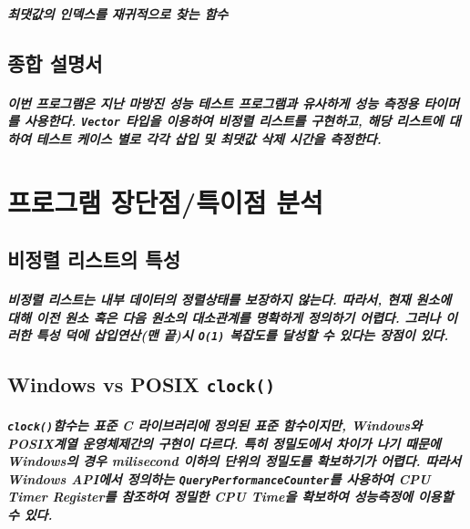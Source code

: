 \documentclass[UTF8, a4paper]{report}
\begin{document}
            \paragraph{%
                \normalfont 최댓값의 인덱스를 재귀적으로 찾는 함수
            }

        \section{종합 설명서}

            \paragraph{%
                \normalfont 이번 프로그램은 지난 마방진 성능 테스트 프로그램과 유사하게 성능 측정용 타이머를 사용한다. \texttt{Vector} 타입을 이용하여 비정렬 리스트를 구현하고, 해당 리스트에 대하여 테스트 케이스 별로 각각 삽입 및 최댓값 삭제 시간을 측정한다. 
            }
            
    \chapter{프로그램 장단점/특이점 분석}
            \section{비정렬 리스트의 특성}
            \paragraph{%
                \normalfont 비정렬 리스트는 내부 데이터의 정렬상태를 보장하지 않는다. 따라서, 현재 원소에 대해 이전 원소 혹은 다음 원소의 대소관계를 명확하게 정의하기 어렵다. 그러나 이러한 특성 덕에 삽입연산(맨 끝)시 \texttt{O(1)} 복잡도를 달성할 수 있다는 장점이 있다.
            }   

            \section{Windows vs POSIX \texttt{clock()}}
            \paragraph{%
                \normalfont \texttt{clock()}함수는 표준 C 라이브러리에 정의된 표준 함수이지만, Windows와 POSIX계열 운영체제간의 구현이 다르다. 특히 정밀도에서 차이가 나기 때문에 Windows의 경우 milisecond 이하의 단위의 정밀도를 확보하기가 어렵다. 따라서 Windows API에서 정의하는 \texttt{QueryPerformanceCounter}를 사용하여 CPU Timer Register를 참조하여 정밀한 CPU Time을 확보하여 성능측정에 이용할 수 있다.
            }
\end{document}
